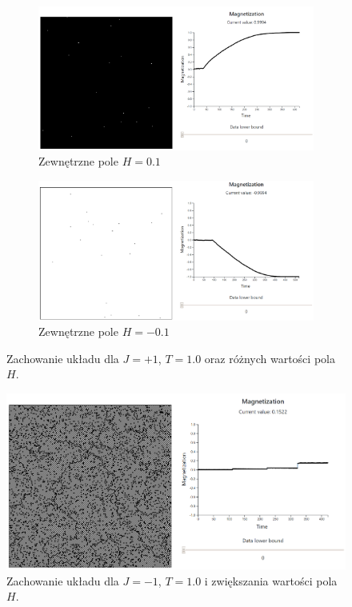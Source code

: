\documentclass[11pt] {article}
\begin{document}
\begin{figure}[H]
\begin{subfigure}{.5\textwidth}
  \centering
  \includegraphics[width=0.9\linewidth]{res/Hplus.png}
  \caption{Zewnętrzne pole $H = 0.1$}
  \label{fig:H1}
\end{subfigure}
\begin{subfigure}{.5\textwidth}
  \centering
  \includegraphics[width=0.9\linewidth]{res/Hminus.png}
  \caption{Zewnętrzne pole $H = -0.1$}
  \label{fig:H2}
\end{subfigure}
\caption{Zachowanie układu dla $J = +1$, $T = 1.0$ oraz różnych wartości pola $H$.}
\label{fig:H}
\end{figure}

\begin{figure}[H]
\centering
\includegraphics[width=0.9\linewidth]{res/Hplus2.png}
\caption{Zachowanie układu dla $J = -1$, $T = 1.0$ i zwiększania wartości pola $H$.}
\label{fig:HJneg}
\end{figure}
\end{document}
